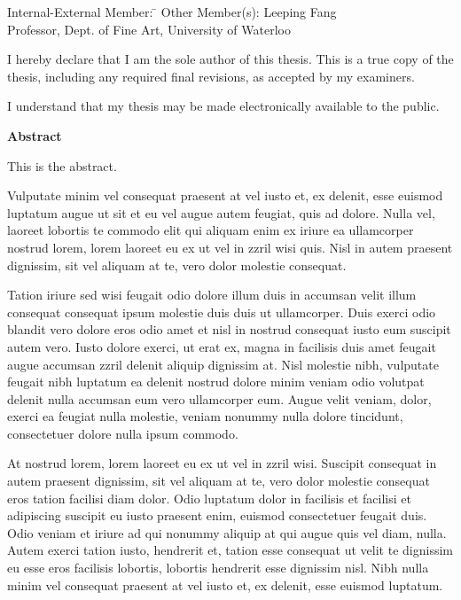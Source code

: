   \noindent
\begin{tabbing}
Internal-External Member: \=  \kill %
Other Member(s): \> Leeping Fang \\
\> Professor, Dept. of Fine Art, University of Waterloo \\
\end{tabbing}

\cleardoublepage

  \noindent
I hereby declare that I am the sole author of this thesis. This is a true copy of the thesis, including any required final revisions, as accepted by my examiners.

  \bigskip
  
  \noindent
I understand that my thesis may be made electronically available to the public.

\cleardoublepage


\begin{center}\textbf{Abstract}\end{center}

This is the abstract.

Vulputate minim vel consequat praesent at vel iusto et, ex delenit, esse euismod luptatum augue ut sit et eu vel augue autem feugiat, quis ad dolore. Nulla vel, laoreet lobortis te commodo elit qui aliquam enim ex iriure ea ullamcorper nostrud lorem, lorem laoreet eu ex ut vel in zzril wisi quis. Nisl in autem praesent dignissim, sit vel aliquam at te, vero dolor molestie consequat.

Tation iriure sed wisi feugait odio dolore illum duis in accumsan velit illum consequat consequat ipsum molestie duis duis ut ullamcorper. Duis exerci odio blandit vero dolore eros odio amet et nisl in nostrud consequat iusto eum suscipit autem vero. Iusto dolore exerci, ut erat ex, magna in facilisis duis amet feugait augue accumsan zzril delenit aliquip dignissim at. Nisl molestie nibh, vulputate feugait nibh luptatum ea delenit nostrud dolore minim veniam odio volutpat delenit nulla accumsan eum vero ullamcorper eum. Augue velit veniam, dolor, exerci ea feugiat nulla molestie, veniam nonummy nulla dolore tincidunt, consectetuer dolore nulla ipsum commodo.

At nostrud lorem, lorem laoreet eu ex ut vel in zzril wisi. Suscipit consequat in autem praesent dignissim, sit vel aliquam at te, vero dolor molestie consequat eros tation facilisi diam dolor. Odio luptatum dolor in facilisis et facilisi et adipiscing suscipit eu iusto praesent enim, euismod consectetuer feugait duis. Odio veniam et iriure ad qui nonummy aliquip at qui augue quis vel diam, nulla. Autem exerci tation iusto, hendrerit et, tation esse consequat ut velit te dignissim eu esse eros facilisis lobortis, lobortis hendrerit esse dignissim nisl. Nibh nulla minim vel consequat praesent at vel iusto et, ex delenit, esse euismod luptatum.


